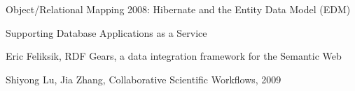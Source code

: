 \documentclass[a4paper, notitlepage]{article}
\begin{document}
\begin{thebibliography}{99}

 Object/Relational Mapping 2008: Hibernate and the Entity Data Model (EDM)

 Supporting Database Applications as a Service

 Eric Feliksik, RDF Gears, a data integration framework for the Semantic Web

 Shiyong Lu, Jia Zhang, Collaborative Scientific Workflows, 2009

\end{thebibliography}
\end{document}
